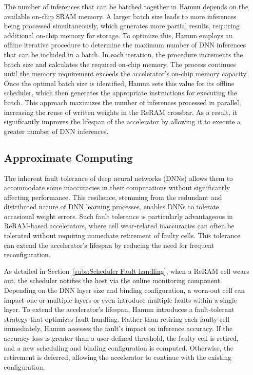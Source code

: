The number of inferences that can be batched together in Hamun depends on the available on-chip SRAM memory. A larger batch size leads to more inferences being processed simultaneously, which generates more partial results, requiring additional on-chip memory for storage. To optimize this, Hamun employs an offline iterative procedure to determine the maximum number of DNN inferences that can be included in a batch. In each iteration, the procedure increments the batch size and calculates the required on-chip memory. The process continues until the memory requirement exceeds the accelerator's on-chip memory capacity. Once the optimal batch size is identified, Hamun sets this value for its offline scheduler, which then generates the appropriate instructions for executing the batch. This approach maximizes the number of inferences processed in parallel, increasing the reuse of written weights in the ReRAM crossbar. As a result, it significantly improves the lifespan of the accelerator by allowing it to execute a greater number of DNN inferences.

\subsection{Approximate Computing}\label{subs:Approximation}
The inherent fault tolerance of deep neural networks (DNNs) allows them to accommodate some inaccuracies in their computations without significantly affecting performance. This resilience, stemming from the redundant and distributed nature of DNN learning processes, enables DNNs to tolerate occasional weight errors. Such fault tolerance is particularly advantageous in ReRAM-based accelerators, where cell wear-related inaccuracies can often be tolerated without requiring immediate retirement of faulty cells. This tolerance can extend the accelerator’s lifespan by reducing the need for frequent reconfiguration.


As detailed in Section~\ref{subs:Scheduler Fault handling}, when a ReRAM cell wears out, the scheduler notifies the host via the online monitoring component. Depending on the DNN layer size and binding configuration, a worn-out cell can impact one or multiple layers or even introduce multiple faults within a single layer. To extend the accelerator’s lifespan, Hamun introduces a fault-tolerant strategy that optimizes fault handling. Rather than retiring each faulty cell immediately, Hamun assesses the fault’s impact on inference accuracy. If the accuracy loss is greater than a user-defined threshold, the faulty cell is retired, and a new scheduling and binding configuration is computed. Otherwise, the retirement is deferred, allowing the accelerator to continue with the existing configuration.


